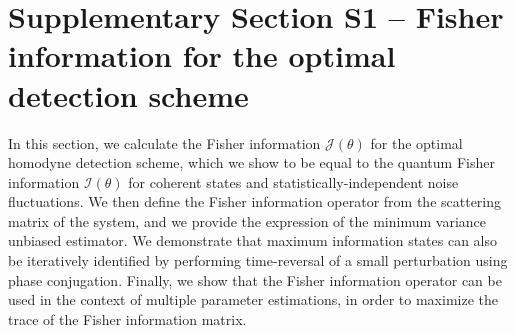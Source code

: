 \documentclass[aps,pra,twocolumn,amsmath,amssymb,superscriptaddress,10pt,nobibnotes]{revtex4-2}
\begin{document}
\section*{Supplementary Section S1 -- Fisher information for the optimal detection scheme}

In this section, we calculate the Fisher information $\mathcal{J}(\theta)$ for the optimal homodyne detection scheme, which we show to be equal to the quantum Fisher information $\mathcal{I}(\theta)$ for coherent states and statistically-independent noise fluctuations. We then define the Fisher information operator from the scattering matrix of the system, and we provide the expression of the minimum variance unbiased estimator. We demonstrate that maximum information states can also be iteratively identified by performing time-reversal of a small perturbation using phase conjugation. Finally, we show that the Fisher information operator can be used in the context of multiple parameter estimations, in order to maximize the trace of the Fisher information matrix. 
\end{document}
